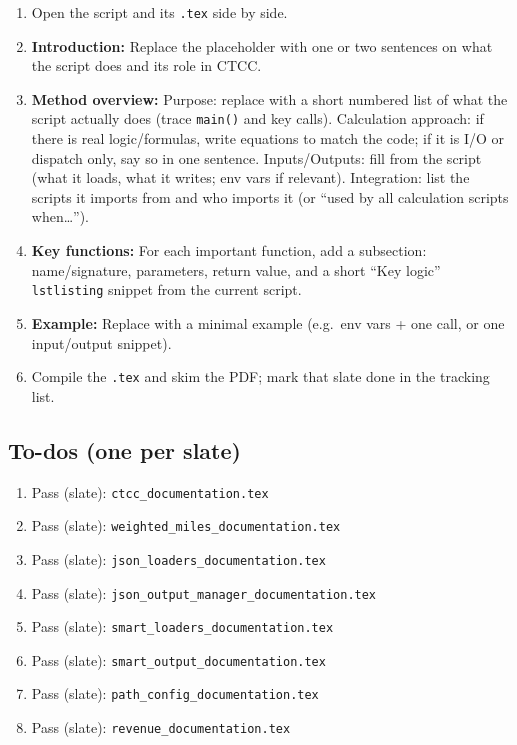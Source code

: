 \documentclass[12pt]{article}
\begin{document}
\begin{enumerate}
  \item Open the script and its \texttt{.tex} side by side.
  \item \textbf{Introduction:} Replace the placeholder with one or two sentences on what the script does and its role in CTCC.
  \item \textbf{Method overview:} Purpose: replace with a short numbered list of what the script actually does (trace \texttt{main()} and key calls). Calculation approach: if there is real logic/formulas, write equations to match the code; if it is I/O or dispatch only, say so in one sentence. Inputs/Outputs: fill from the script (what it loads, what it writes; env vars if relevant). Integration: list the scripts it imports from and who imports it (or ``used by all calculation scripts when\ldots'').
  \item \textbf{Key functions:} For each important function, add a subsection: name/signature, parameters, return value, and a short ``Key logic'' \texttt{lstlisting} snippet from the current script.
  \item \textbf{Example:} Replace with a minimal example (e.g.\ env vars + one call, or one input/output snippet).
  \item Compile the \texttt{.tex} and skim the PDF; mark that slate done in the tracking list.
\end{enumerate}

\subsection{To-dos (one per slate)}

\begin{enumerate}
  \item Pass (slate): \texttt{ctcc\_documentation.tex}
  \item Pass (slate): \texttt{weighted\_miles\_documentation.tex}
  \item Pass (slate): \texttt{json\_loaders\_documentation.tex}
  \item Pass (slate): \texttt{json\_output\_manager\_documentation.tex}
  \item Pass (slate): \texttt{smart\_loaders\_documentation.tex}
  \item Pass (slate): \texttt{smart\_output\_documentation.tex}
  \item Pass (slate): \texttt{path\_config\_documentation.tex}
  \item Pass (slate): \texttt{revenue\_documentation.tex}
\end{enumerate}
\end{document}
